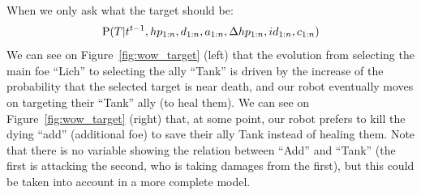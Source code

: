When we only ask what the target should be:
$$\mathrm{P}(T | t^{t-1}, hp_{1:n},d_{1:n}, a_{1:n}, \Delta hp_{1:n}, id_{1:n}, c_{1:n})$$ 
We can see on Figure~\ref{fig:wow_target} (left) that the evolution from selecting the main foe ``Lich'' to selecting the ally ``Tank'' is driven by the increase of 
the probability that the selected target is near death, 
and our robot eventually moves on targeting their ``Tank'' ally (to heal them). We can see on Figure~\ref{fig:wow_target} (right) that, at some point, our robot prefers to kill the dying ``add'' (additional foe) to save their ally Tank instead of healing them. Note that there is no variable showing the relation between ``Add'' and ``Tank'' (the first is attacking the second, who is taking damages from the first), but this could be taken into account in a more complete model.

